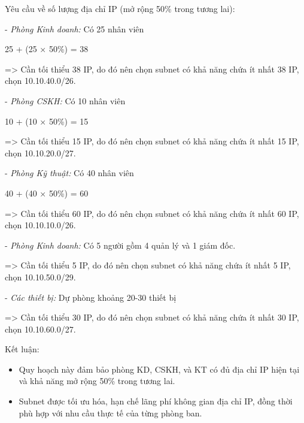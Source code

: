 Yêu cầu về số lượng địa chỉ IP (mở rộng 50\% trong tương lai):

- \textit{Phòng Kinh doanh:} Có 25 nhân viên

\begin{center}
    25 + (25 × 50\%) = 38
\end{center}

=> Cần tối thiểu 38 IP, do đó nên chọn subnet có khả năng chứa ít nhất 38 IP, chọn 10.10.40.0/26.

- \textit{Phòng CSKH:} Có 10 nhân viên

\begin{center}
    10 + (10 × 50\%) = 15
\end{center}

=> Cần tối thiểu 15 IP, do đó nên chọn subnet có khả năng chứa ít nhất 15 IP, chọn 10.10.20.0/27.

- \textit{Phòng Kỹ thuật:} Có 40 nhân viên

\begin{center}
    40 + (40 × 50\%) = 60
\end{center}

=> Cần tối thiểu 60 IP, do đó nên chọn subnet có khả năng chứa ít nhất 60 IP, chọn 10.10.10.0/26.

- \textit{Phòng Kinh doanh:} Có 5 người gồm 4 quản lý và 1 giám đốc.

=> Cần tối thiểu 5 IP, do đó nên chọn subnet có khả năng chứa ít nhất 5 IP, chọn 10.10.50.0/29.

- \textit{Các thiết bị:} Dự phòng khoảng 20-30 thiết bị 

=> Cần tối thiểu 30 IP, do đó nên chọn subnet có khả năng chứa ít nhất 30 IP, chọn 10.10.60.0/27.

Kết luận:
\begin{itemize}[left=2cm]
    \item Quy hoạch này đảm bảo phòng KD, CSKH, và KT có đủ địa chỉ IP hiện tại và khả năng mở rộng 50\% trong tương lai.
    \item Subnet được tối ưu hóa, hạn chế lãng phí không gian địa chỉ IP, đồng thời phù hợp với nhu cầu thực tế của từng phòng ban.
\end{itemize}
